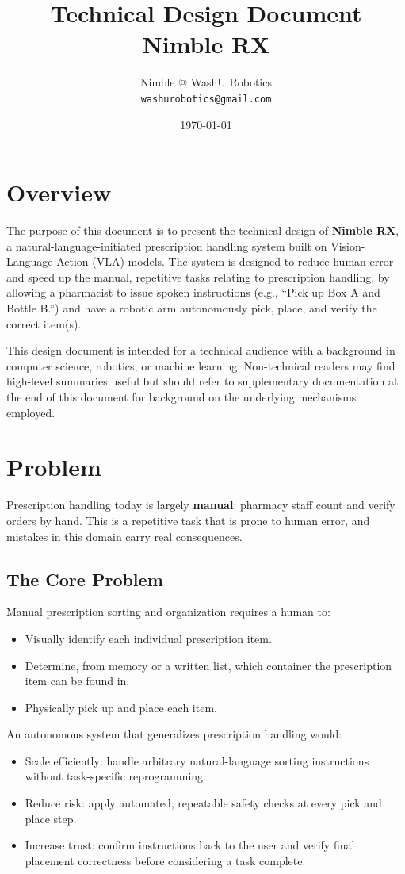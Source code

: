 \documentclass[12pt,a4paper]{article}
\title{\textbf{Technical Design Document}\\[0.5em]\large Nimble RX}
\author{Nimble @ WashU Robotics \\ \texttt{washurobotics@gmail.com}}
\date{\today}
\begin{document}
\maketitle
\newpage
\tableofcontents
\newpage
 
\section{Overview}
 
The purpose of this document is to present the technical design of \textbf{Nimble RX}, a natural-language-initiated prescription handling system built on Vision-Language-Action (VLA) models. The system is designed to reduce human error and speed up the manual, repetitive tasks relating to prescription handling, by allowing a pharmacist to issue spoken instructions (e.g., ``Pick up Box A and Bottle B.'') and have a robotic arm autonomously pick, place, and verify the correct item(s).
 
This design document is intended for a technical audience with a background in computer science, robotics, or machine learning. Non-technical readers may find high-level summaries useful but should refer to supplementary documentation at the end of this document for background on the underlying mechanisms employed.
\newpage
\section{Problem}
 
Prescription handling today is largely \textbf{manual}: pharmacy staff count and verify orders by hand. This is a repetitive task that is prone to human error, and mistakes in this domain carry real consequences.
 
\subsection{The Core Problem}
 
Manual prescription sorting and organization requires a human to:
\begin{itemize}
  \item Visually identify each individual prescription item.
  \item Determine, from memory or a written list, which container the prescription item can be found in.
  \item Physically pick up and place each item.
\end{itemize}
An autonomous system that generalizes prescription handling would:
\begin{itemize}
  \item Scale efficiently: handle arbitrary natural-language sorting instructions without task-specific reprogramming.
  \item Reduce risk: apply automated, repeatable safety checks at every pick and place step.
  \item Increase trust: confirm instructions back to the user and verify final placement correctness before considering a task complete.
\end{itemize}
 
\end{document}

